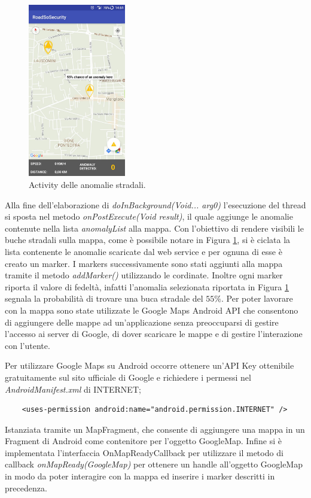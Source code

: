 \documentclass[a4paper, 11pt]{article} %
\begin{document}
\begin{figure} %
	\begin{center}
		\includegraphics[width=0.38\textwidth]{images/anomalyActivity.jpg}
	\end{center}
	\caption{Activity delle anomalie stradali.}
	\label{fig:activityAnomaly}
\end{figure}

Alla fine dell'elaborazione di \textit{doInBackground(Void... arg0)} l'esecuzione del thread si sposta nel metodo \textit{onPostExecute(Void result)}, il quale aggiunge le anomalie contenute nella lista \textit{anomalyList} alla mappa. Con l'obiettivo di rendere visibili le buche stradali sulla mappa, come è possibile notare in Figura \ref{fig:activityAnomaly}, si è ciclata la lista contenente le anomalie scaricate dal web service e per ognuna di esse è creato un marker. I markers successivamente sono stati aggiunti alla mappa tramite il metodo \textit{addMarker()} utilizzando le cordinate. Inoltre ogni marker riporta il valore di fedeltà, infatti l'anomalia selezionata riportata in Figura \ref{fig:activityAnomaly} segnala la probabilità di trovare una buca stradale del $55\%$. 
Per poter lavorare con la mappa sono state utilizzate le Google Maps Android API che consentono di aggiungere delle mappe ad un’applicazione senza preoccuparsi di gestire l’accesso ai server di Google, di dover scaricare le mappe e di gestire l’interazione con l’utente. 

Per utilizzare Google Maps su Android occorre ottenere un’API Key ottenibile gratuitamente sul sito ufficiale di Google e richiedere i permessi nel \textit{AndroidManifest.xml} di INTERNET;
\begin{verbatim}
	<uses-permission android:name="android.permission.INTERNET" />
\end{verbatim}
Istanziata tramite un MapFragment, che consente di aggiungere una mappa in un Fragment di Android come contenitore per l’oggetto GoogleMap. Infine si è implementata l’interfaccia OnMapReadyCallback per utilizzare il metodo di callback \textit{onMapReady(GoogleMap)} per ottenere un handle all’oggetto GoogleMap in modo da poter interagire con la mappa ed inserire i marker descritti in precedenza.
\end{document}

